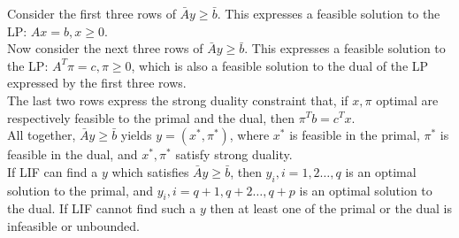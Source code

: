 \documentclass[12pt]{article}
\begin{document}
\begin{enumerate}
\begin{enumerate}
        Consider the first three rows of $\bar{A}y\geq\bar{b}$. This expresses
        a feasible solution to the LP: $Ax=b,x\geq0$.\\

        Now consider the next three rows of $\bar{A}y\geq\bar{b}$. This
        expresses a feasible solution to the LP: $A^T\pi=c,\pi\geq0$, which is
        also a feasible solution to the dual of the LP expressed by the first
        three rows.\\

        The last two rows express the strong duality constraint that, if
        $x,\pi$ optimal are respectively feasible to the primal and the dual,
        then $\pi^Tb=c^Tx$.\\

        All together, $\bar{A}y\geq\bar{b}$ yields $y=(x^*,\pi^*)$, where
        $x^*$ is feasible in the primal, $\pi^*$ is feasible in the dual, and
        $x^*,\pi^*$ satisfy strong duality.\\

        If LIF can find a $y$ which satisfies $\bar{A}y\geq\bar{b}$, then
        $y_i,i=1,2\ldots,q$ is an optimal solution to the primal, and
        $y_i,i=q+1,q+2\ldots,q+p$ is an optimal solution to the dual. If LIF
        cannot find such a $y$ then at least one of the primal or the dual is
        infeasible or unbounded.\\
    \end{enumerate}
\end{enumerate}
\end{document}
